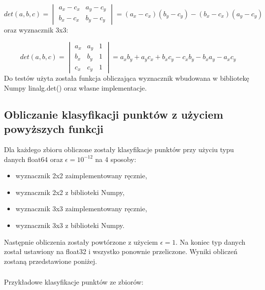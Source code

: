 \documentclass[11pt]{scrartcl}
\begin{document}
    \[det(a,b,c)=
    \begin{vmatrix}
        a_x - c_x & a_y - c_y \\
        b_x - c_x & b_y - c_y
    \end{vmatrix}
    =(a_x - c_x)(b_y - c_y) - (b_x - c_x)(a_y - c_y)\]
    oraz wyznacznik 3x3:

    \[det(a,b,c)=
    \begin{vmatrix}
        a_x & a_y & 1 \\
        b_x & b_y & 1 \\
        c_x & c_y & 1
    \end{vmatrix}
    =a_x b_y + a_y c_x + b_x c_y - c_x b_y - b_x a_y - a_x c_y\]
    Do testów użyta została funkcja obliczająca wyznacznik wbudowana w bibliotekę
    Numpy linalg.det() oraz własne implementacje.

    \subsection{Obliczanie klasyfikacji punktów z użyciem powyższych funkcji}
    Dla każdego zbioru obliczone zostały klasyfikacje punktów przy użyciu
    typu danych float64 oraz $\epsilon=10^{-12}$ na 4 sposoby:

    \begin{itemize}
        \item wyznacznik 2x2 zaimplementowany ręcznie,
        \item wyznacznik 2x2 z biblioteki Numpy,
        \item wyznacznik 3x3 zaimplementowany ręcznie,
        \item wyznacznik 3x3 z biblioteki Numpy.
    \end{itemize}
    Następnie obliczenia zostały powtórzone z użyciem $\epsilon=1$. Na koniec
    typ danych został ustawiony na float32 i wszystko ponownie przeliczone.
    Wyniki obliczeń zostaną przedstawione poniżej.
    \subsubsection*{}
    Przykładowe klasyfikacje punktów ze zbiorów:
\end{document}
